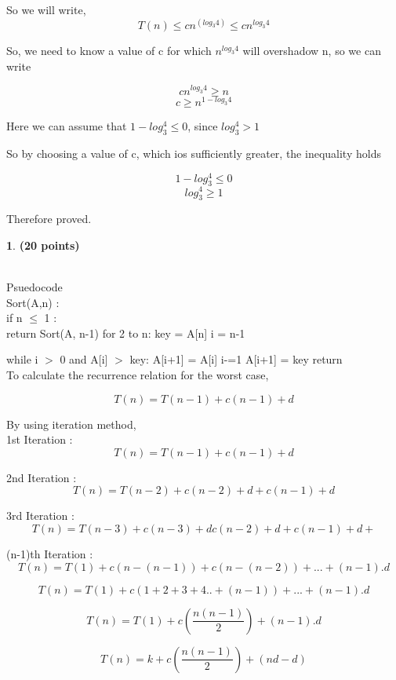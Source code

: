 \documentclass[11pt]{article}
\theoremstyle{definition}
\newtheorem{prob}{}
\newcommand{\solution}{\medskip\noindent{\color{DarkBlue}\textbf{Solution:}}}
\begin{document}
\begin{enumerate}
    So we will write,
    \[ T(n) \leq cn^{(log_3 4)} \leq cn^{log_3 4} \]

    So, we need to know a value of c for which $n^{log_3 4}$ will overshadow n, so we can write

    \[ cn^{log_3 4} \geq n \]
    \[ c \geq n^{1- log_3 4} \]

    Here we can assume that $1-log_3 ^4 \leq 0$, since $log_3 ^4 > 1$

    So by choosing a value of c, which ios sufficiently greater, the inequality holds

    \[ 1 - log_3 ^4 \leq 0 \]
    \[ log_3 ^4 \geq 1 \]

    Therefore proved.
\end{enumerate}

\begin{prob} \textbf{(20 points)}
\end{prob}
\solution \\

Psuedocode \\

Sort(A,n) : \\
\tabto{2cm} if n $\leq$ 1 : \\
\tabto{3cm} return
\tabto{2cm} Sort(A, n-1)
\tabto{2cm} for 2 to n:
\tabto{3cm} key = A[n]
\tabto{3cm} i = n-1

\tabto{3cm} while i $>$ 0 and A[i] $>$ key:
\tabto{4cm} A[i+1] = A[i]
\tabto{4cm} i-=1
\tabto{3cm} A[i+1] = key
\tabto{2cm} return
\\

To calculate the recurrence relation for the worst case,

\[ T(n) = T(n-1) + c(n-1) + d \]

By using iteration method,\\

1st Iteration : \[ T(n) = T(n-1) + c(n-1) + d \]

2nd Iteration : \[ T(n) = T(n-2) + c(n-2) + d + c(n-1) + d \]

3rd Iteration : \[ T(n) = T(n-3) + c(n-3) + d c(n-2) + d + c(n-1) + d + \]

(n-1)th Iteration : \[ T(n) = T(1) + c(n-(n-1))+ c(n-(n-2)) + ... + (n-1).d \]

\[ T(n) = T(1) + c(1+2+3+4..+(n-1)) + ... + (n-1).d \]

\[ T(n) = T(1) + c(\frac{n(n-1)}{2}) + (n-1).d \]

\[ T(n) = k + c(\frac{n(n-1)}{2}) + (nd-d) \]
\end{document}
